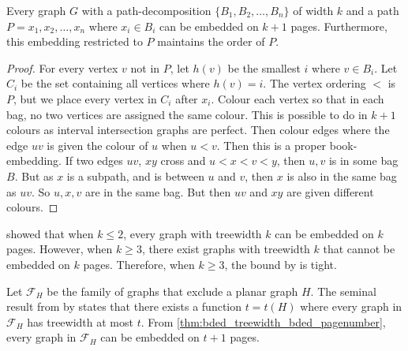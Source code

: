 \begin{theorem}\label{thm:pw_book_embedding}
	Every graph \(G\) with a path-decomposition $\{B_1, B_2, \ldots , B_n\}$ of width $k$ and a path $P = x_1, x_2, \ldots, x_n$ where $x_i \in B_i$ can be embedded on $k + 1$ pages. Furthermore, this embedding restricted to $P$ maintains the order of $P$.
\end{theorem}

\begin{proof}
	For every vertex $v$ not in $P$, let $h(v)$ be the smallest $i$ where $v \in B_i$. Let $C_i$ be the set containing all vertices where $h(v) = i$. The vertex ordering $<$ is $P$, but we place every vertex in $C_i$ after $x_i$. Colour each vertex so that in each bag, no two vertices are assigned the same colour. This is possible to do in $k+1$ colours as interval intersection graphs are perfect. Then colour edges where the edge $uv$ is given the colour of $u$ when $u < v$. Then this is a proper book-embedding. If two edges $uv$, $xy$ cross and $u < x < v < y$, then $u,v$ is in some bag $B$. But as $x$ is a subpath, and is between $u$ and $v$, then $x$ is also in the same bag as $uv$. So $u,x,v$ are in the same bag. But then $uv$ and $xy$ are given different colours. 
\end{proof}

\textcite{dujmovicGraphTreewidthGeometric2007} showed that when $k \leq 2$, every graph with treewidth $k$ can be embedded on $k$ pages. However, when $k \geq 3$, there exist graphs with treewidth $k$ that cannot be embedded on $k$ pages. Therefore, when $k \geq 3$, the bound by \textcite{ganleyPagenumberTrees2001} is tight. 

Let $\mathcal{F}_H$ be the family of graphs that exclude a planar graph $H$. The seminal result from \cite{robertsonQuicklyExcludingPlanar1994} by \citeauthor{robertsonQuicklyExcludingPlanar1994} states that there exists a function $t = t(H)$ where every graph in $\mathcal{F}_H$ has treewidth at most $t$. From \cref{thm:bded_treewidth_bded_pagenumber}, every graph in  $\mathcal{F}_H$ can be embedded on $t + 1$ pages.